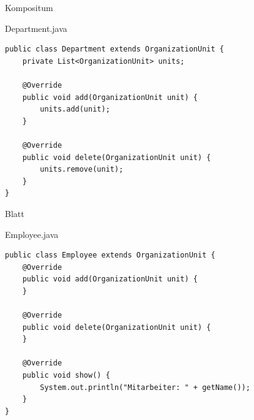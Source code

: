 \begin{frame}[fragile]{Kompositum}
	\begin{exampleblock}{Department.java}
        \begin{lstlisting}
public class Department extends OrganizationUnit {
    private List<OrganizationUnit> units;

    @Override
    public void add(OrganizationUnit unit) {
        units.add(unit);
    }

    @Override
    public void delete(OrganizationUnit unit) {
    	units.remove(unit);
    }
}
        \end{lstlisting}
 	\end{exampleblock}
\end{frame}

\begin{frame}[fragile]{Blatt}
	\begin{exampleblock}{Employee.java}
        \begin{lstlisting}
public class Employee extends OrganizationUnit {
	@Override
	public void add(OrganizationUnit unit) {
	}

	@Override
	public void delete(OrganizationUnit unit) {
	}

    @Override
    public void show() {
        System.out.println("Mitarbeiter: " + getName());
    }
}
        \end{lstlisting}
 	\end{exampleblock}
\end{frame}

